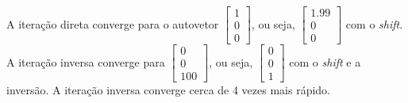 \documentclass[a4paper,11pt]{article}
\begin{document}
\begin{enumerate}[label=\textbf{(\alph*)}]
\begin{center}
\begin{tabular}{ | c | c | c | c | }
                    \hline
                \end{tabular}
            \end{center}
            A iteração direta converge para o autovetor $\begin{bmatrix} 1 \\ 0 \\ 0\end{bmatrix}$, ou seja, $\begin{bmatrix} 1.99 \\ 0 \\ 0\end{bmatrix}$ com o \textit{shift}. A iteração inversa converge para $\begin{bmatrix} 0 \\ 0\\ 100\end{bmatrix}$, ou seja, $\begin{bmatrix} 0 \\ 0 \\ 1\end{bmatrix}$ com o \textit{shift} e a inversão. A iteração inversa converge cerca de 4 vezes mais rápido.
            

\end{enumerate}
\end{document}
